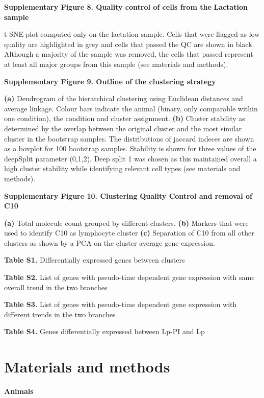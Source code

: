 \documentclass[titlepage, 12pt, oneside]{amsart}
\begin{document}
\textbf{Supplementary Figure 8. Quality control of cells from the}
\textbf{Lactation sample}

t-SNE plot computed only on the lactation sample.
Cells that were flagged as low quality are highlighted in grey and cells that passed the QC are shown in black.
Although a majority of the sample was removed, the cells that passed represent at least all major groups from this sample (see materials and methods).

\textbf{Supplementary Figure 9. Outline of the clustering strategy }

\textbf{(a)} Dendrogram of the hierarchical clustering using Euclidean distances and average linkage.
Colour bars indicate the animal (binary, only comparable within one condition), the condition and cluster assignment.
\textbf{(b)} Cluster stability as determined by the overlap between the original cluster and the most similar cluster in the bootstrap samples.
The distributions of jaccard indeces are shown as a boxplot for 100 bootstrap samples.
Stability is shown for three values of the deepSplit parameter (0,1,2).
Deep split 1 was chosen as this maintained overall a high cluster stability while identifying relevant cell types (see materials and methods).

\textbf{Supplementary Figure 10. Clustering} \textbf{Quality Control and
removal of C10}

\textbf{(a)} Total molecule count grouped by different clusters.
\textbf{(b)} Markers that were used to identify C10 as lymphocyte cluster\autocite{Scheele2017} \textbf{(c)} Separation of C10 from all other clusters as shown by a PCA on the cluster average gene expression.

\textbf{Table S1.} Differentially expressed genes between clusters

\textbf{Table S2.} List of genes with pseudo-time dependent gene
expression with same overall trend in the two branches

\textbf{Table S3.} List of genes with pseudo-time dependent gene
expression with different trends in the two branches

\textbf{Table S4.} Genes differentially expressed between Lp-PI and Lp

\section{Materials and methods}

\textbf{Animals}
\end{document}
